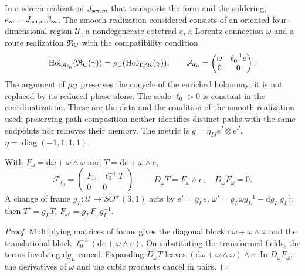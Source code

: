 In a screen realization \(J_{{\rm scr},m}\) that transports the form and the soldering, \(e_m=J_{{\rm scr},m}\beta_m\). The smooth realization considered consists of an oriented four-dimensional region \(\mathcal U\), a nondegenerate cotetrad \(e\), a Lorentz connection \(\omega\) and a route realization \(\mathfrak R_{\rm C}\) with the compatibility condition
\begin{equation}
 \operatorname{Hol}_{\mathcal A_{\ell_0}}
          (\mathfrak R_{\rm C}(\gamma))
 =\rho_{\rm C}(\operatorname{Hol}_{\rm TPK}(\gamma)),\qquad
 \mathcal A_{\ell_0}=
 \begin{pmatrix}\omega&\ell_0^{-1}e\\0&0\end{pmatrix}.
\label{hmtcuatro:ant:compatibilidad-holonomia}
\end{equation}
The argument of \(\rho_{\rm C}\) preserves the cocycle of the enriched holonomy; it is not replaced by its reduced phase alone. The scale \(\ell_0>0\) is constant in the coordinatization. These are the data and the condition of the smooth realization used; preserving path composition neither identifies distinct paths with the same endpoints nor removes their memory. The metric is \(g=\eta_{IJ}e^I\otimes e^J\), \(\eta=\operatorname{diag}(-1,1,1,1)\).

\begin{proposition}
\label{hmtcuatro:ant:curvatura} With \(F_\omega=\mathrm d\omega+\omega\wedge\omega\) and \(T=\mathrm de+\omega\wedge e\),
\[
 \mathcal F_{\ell_0}=
 \begin{pmatrix}F_\omega&\ell_0^{-1}T\\0&0\end{pmatrix},
 \qquad D_\omega T=F_\omega\wedge e,\quad D_\omega F_\omega=0 .
\]
A change of frame \(g_L:\mathcal U\to SO^+(3,1)\) acts by \(e'=g_Le\), \(\omega'=g_L\omega g_L^{-1}-\mathrm dg_L\,g_L^{-1}\); then \(T'=g_LT\), \(F_{\omega'}=g_LF_\omega g_L^{-1}\).
\end{proposition}
\begin{proof}
Multiplying matrices of forms gives the diagonal block \(\mathrm d\omega+\omega\wedge\omega\) and the translational block \(\ell_0^{-1}(\mathrm de+\omega\wedge e)\). On substituting the transformed fields, the terms involving \(\mathrm dg_L\) cancel. Expanding \(D_\omega T\) leaves \((\mathrm d\omega+\omega\wedge\omega)\wedge e\). In \(D_\omega F_\omega\), the derivatives of \(\omega\) and the cubic products cancel in pairs.
\end{proof}

